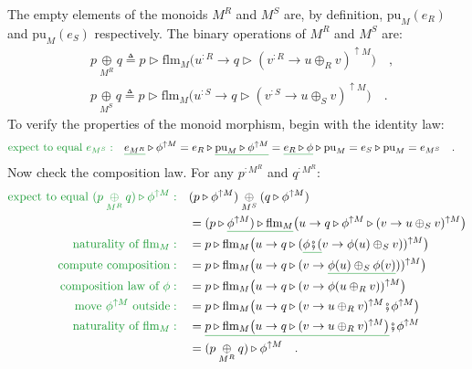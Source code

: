The empty elements of the monoids $M^{R}$ and $M^{S}$ are, by definition,
$\text{pu}_{M}(e_{R})$ and $\text{pu}_{M}(e_{S})$ respectively.
The binary operations of $M^{R}$ and $M^{S}$ are:
\begin{align*}
 & p\underset{M^{R}}{\oplus}q\triangleq p\triangleright\text{flm}_{M}\big(u^{:R}\rightarrow q\triangleright(v^{:R}\rightarrow u\oplus_{R}v)^{\uparrow M}\big)\quad,\\
 & p\underset{M^{S}}{\oplus}q\triangleq p\triangleright\text{flm}_{M}\big(u^{:S}\rightarrow q\triangleright(v^{:S}\rightarrow u\oplus_{S}v)^{\uparrow M}\big)\quad.
\end{align*}
To verify the properties of the monoid morphism, begin with the identity
law:
\begin{align*}
{\color{greenunder}\text{expect to equal }e_{M^{S}}:}\quad & \gunderline{e_{M^{R}}}\triangleright\phi^{\uparrow M}=e_{R}\triangleright\gunderline{\text{pu}_{M}\triangleright\phi^{\uparrow M}}=\gunderline{e_{R}\triangleright\phi}\triangleright\text{pu}_{M}=e_{S}\triangleright\text{pu}_{M}=e_{M^{S}}\quad.
\end{align*}
Now check the composition law. For any $p^{:M^{R}}$ and $q^{:M^{R}}$:
\begin{align*}
{\color{greenunder}\text{expect to equal }(p\underset{M^{R}}{\oplus}q)\triangleright\phi^{\uparrow M}:}\quad & (p\triangleright\phi^{\uparrow M})\underset{M^{S}}{\oplus}(q\triangleright\phi^{\uparrow M})\\
 & =(p\triangleright\gunderline{\phi^{\uparrow M})\triangleright\text{flm}_{M}}\big(u\rightarrow q\triangleright\phi^{\uparrow M}\triangleright(v\rightarrow u\oplus_{S}v)^{\uparrow M}\big)\\
{\color{greenunder}\text{naturality of }\text{flm}_{M}:}\quad & =p\triangleright\text{flm}_{M}\big(u\rightarrow q\triangleright(\gunderline{\phi\bef(}v\rightarrow\phi(u)\oplus_{S}v))^{\uparrow M}\big)\\
{\color{greenunder}\text{compute composition}:}\quad & =p\triangleright\text{flm}_{M}\big(u\rightarrow q\triangleright(v\rightarrow\gunderline{\phi(u)\oplus_{S}\phi(v)}))^{\uparrow M}\big)\\
{\color{greenunder}\text{composition law of }\phi:}\quad & =p\triangleright\text{flm}_{M}\big(u\rightarrow q\triangleright(v\rightarrow\phi(u\oplus_{R}v))^{\uparrow M}\big)\\
{\color{greenunder}\text{move }\phi^{\uparrow M}\text{ outside}:}\quad & =p\triangleright\text{flm}_{M}\big(u\rightarrow q\triangleright(v\rightarrow u\oplus_{R}v)^{\uparrow M}\bef\phi^{\uparrow M}\big)\\
{\color{greenunder}\text{naturality of }\text{flm}_{M}:}\quad & =\gunderline{p\triangleright\text{flm}_{M}\big(u\rightarrow q\triangleright(v\rightarrow u\oplus_{R}v)^{\uparrow M}\big)}\bef\phi^{\uparrow M}\\
 & =(p\underset{M^{R}}{\oplus}q)\triangleright\phi^{\uparrow M}\quad.
\end{align*}


